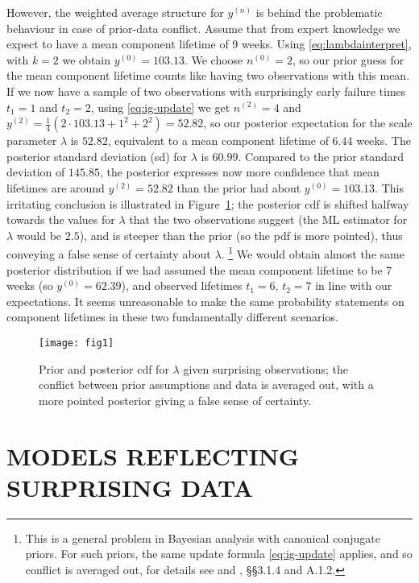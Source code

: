 \documentclass[12pt,a4paper,twocolumn,fleqn]{narms}
\newcommand{\uz}{^{(0)}} %
\newcommand{\un}{^{(n)}} %
\def\yz{y\uz}
\def\yn{y\un}
\newcommand{\yfun}[1]{y^{({#1})}}
\def\nz{n\uz}
\newcommand{\nfun}[1]{n^{({#1})}}
\begin{document}
However, the weighted average structure for $\yn$
is behind the problematic behaviour in case of prior-data conflict.
Assume that from expert knowledge we expect
to have a mean component lifetime of 9 weeks.
Using \eqref{eq:lambdainterpret}, with $k=2$ we obtain $\yz = 103.13$.
We choose $\nz = 2$, so our prior guess for the mean component lifetime
counts like having two observations with this mean.
If we now have a sample of two observations
with surprisingly early failure times $t_1 = 1$ and $t_2 = 2$,
using \eqref{eq:ig-update} we get $\nfun{2} = 4$
and $\yfun{2} = \frac{1}{4}(2 \cdot 103.13 + 1^2 + 2^2) = 52.82$,
so our posterior expectation for the scale parameter $\lambda$ is $52.82$,
equivalent to a mean component lifetime of $6.44$ weeks.
The posterior standard deviation (sd) for $\lambda$ is $60.99$.
Compared to the prior standard deviation of $145.85$,
the posterior expresses now more confidence that mean lifetimes are around $\yfun{2} = 52.82$
than the prior had about $\yz = 103.13$.
This irritating conclusion is illustrated in Figure~\ref{fig:weibull-pdc};
the posterior cdf is shifted halfway towards the values for $\lambda$
that the two observations suggest
(the ML estimator for $\lambda$ would be $2.5$),
and is steeper than the prior (so the pdf is more pointed),
thus conveying a false sense of certainty about $\lambda$.%
\footnote{This is a general problem in Bayesian analysis with canonical conjugate priors.
For such priors, the same update formula \eqref{eq:ig-update} applies,
and so conflict is averaged out, for details see  and , \S\S 3.1.4 and A.1.2.}
We would obtain almost the same %
posterior distribution
if we had assumed the mean component lifetime to be 7 weeks (so $\yz = 62.39$),
and observed lifetimes $t_1 = 6$, $t_2 = 7$ in line with our expectations.
It seems unreasonable to make the same probability statements on component lifetimes in these two fundamentally different scenarios.

\begin{figure}
\texttt{[image: fig1]}
\caption{Prior and posterior cdf for $\lambda$ given surprising observations;
the conflict between prior assumptions and data is averaged out,
with a more pointed posterior giving a false sense of certainty.}
\label{fig:weibull-pdc}
\end{figure}


\section{MODELS REFLECTING SURPRISING DATA}
\label{sec:modforsurpr}
\end{document}
